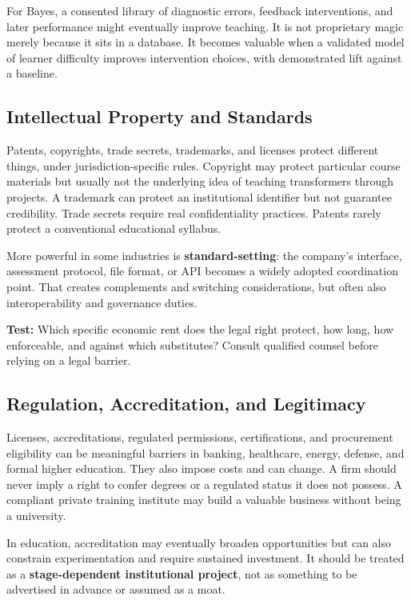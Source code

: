 For Bayes, a consented library of diagnostic errors, feedback interventions, and later performance might eventually improve teaching. It is not proprietary magic merely because it sits in a database. It becomes valuable when a validated model of learner difficulty improves intervention choices, with demonstrated lift against a baseline.

\subsection{Intellectual Property and Standards}
\label{sec:intellectual_property_standards}

Patents, copyrights, trade secrets, trademarks, and licenses protect different things, under jurisdiction-specific rules. Copyright may protect particular course materials but usually not the underlying idea of teaching transformers through projects. A trademark can protect an institutional identifier but not guarantee credibility. Trade secrets require real confidentiality practices. Patents rarely protect a conventional educational syllabus.

More powerful in some industries is \textbf{standard-setting}: the company's interface, assessment protocol, file format, or API becomes a widely adopted coordination point. That creates complements and switching considerations, but often also interoperability and governance duties.

\textbf{Test:} Which specific economic rent does the legal right protect, how long, how enforceable, and against which substitutes? Consult qualified counsel before relying on a legal barrier.

\subsection{Regulation, Accreditation, and Legitimacy}
\label{sec:regulation_accreditation_legitimacy}

Licenses, accreditations, regulated permissions, certifications, and procurement eligibility can be meaningful barriers in banking, healthcare, energy, defense, and formal higher education. They also impose costs and can change. A firm should never imply a right to confer degrees or a regulated status it does not possess. A compliant private training institute may build a valuable business without being a university.

In education, accreditation may eventually broaden opportunities but can also constrain experimentation and require sustained investment. It should be treated as a \textbf{stage-dependent institutional project}, not as something to be advertised in advance or assumed as a moat.

